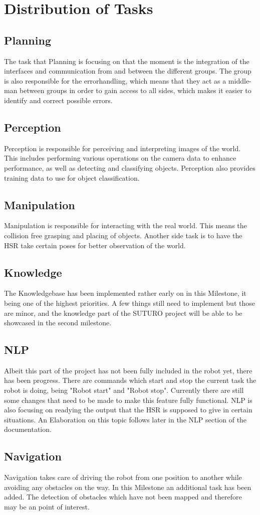 \documentclass[main.tex]{subfiles}
\begin{document}
	
	\chapter{Distribution of Tasks}

		\section{Planning}
		The task that Planning is focusing on that the moment is the integration of the interfaces and communication from and between the different groups. The group is also responsible for the errorhandling, which means that they act as a middle-man between groups in order to gain access to all sides, which makes it easier to identify and correct possible errors.
		
		\section{Perception}
		Perception is responsible for perceiving and interpreting images of the world. This includes performing various operations on the camera data to enhance performance, as well as detecting and classifying objects. Perception also provides training data to use for object classification.
		
		\section{Manipulation}
		Manipulation is responsible for interacting with the real world. This means the collision free grasping and placing of objects. Another side task is to have the HSR take certain poses for better observation of the world. 
		
		\section{Knowledge}
		The Knowledgebase has been implemented rather early on in this Milestone, it being one of the highest priorities. A few things still need to implement but those are minor, and the knowledge part of the SUTURO project will be able to be showcased in the second milestone. 
		
		\section{NLP}
		Albeit this part of the project has not been fully included in the robot yet, there has been progress. There are commands which start and stop the current task the robot is doing, being "Robot start" and "Robot stop". Currently there are still some changes that need to be made to make this feature fully functional. NLP is also focusing on readying the output that the HSR is supposed to give in certain situations. An Elaboration on this topic follows later in the NLP section of the documentation.  
		
		\section{Navigation}
		Navigation takes care of driving the robot from one position to another while avoiding any obstacles on the way. In this Milestone an additional task has been added. The detection of obstacles which have not been mapped and therefore may be an point of interest.
\end{document}
